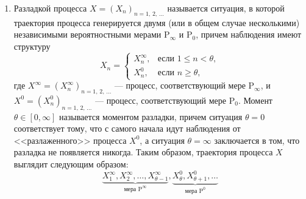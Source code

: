 \documentclass[a4paper,14pt]{extreport}
\renewcommand{\=}[1]{\stackrel{#1}{=}} %
\newcommand{\Proba}{\mathrm{P}}
\newcommand{\discretetime}{n = 1,\,2,\,\ldots}
\newcommand{\newprocessd}[1]{
    \ensuremath{
        #1 = \left(#1 _n\right)_{\discretetime}
    }
}
\newenvironment{boenumerate}
  {\begin{enumerate}\renewcommand\labelenumi{\textbf{\theenumi.}}}
  {\end{enumerate}}
\begin{document}
\begin{boenumerate}
    Построить последовательный тест~-- значит
    указать \textit{момент остановки измерений $\tau$}
    и \textit{решающее правило $\varphi(\cdot)$}.

    \item Разладкой процесса $\newprocessd{X}$
    называется ситуация, в которой траектория
    процесса генерируется двумя (или 
    в общем случае несколькими) независимыми
    вероятностными мерами $\Proba_{\infty}$
    и $\Proba_{0}$, причем наблюдения имеют структуру
    \[
    X_n = 
    \begin{cases}
        X^{\infty}_n, & \text{если } 1 \leqslant n < \theta, \\
        X^{0}_n, & \text{если } n \geqslant \theta,
    \end{cases}
    \]
    где $\newprocessd{X^{\infty}}$ --- 
    процесс, соответствующий мере $\Proba_{\infty}$,
    и $\newprocessd{X^{0}}$ ---
    процесс, соответствующий мере $\Proba_{0}$.
    Момент $\theta \in [0, \infty]$
    называется моментом разладки, причем
    ситуация $\theta = 0$ соответствует тому, что 
    с самого начала идут наблюдения от 
    <<разлаженного>> процесса $X^{0}$,
    а ситуация $\theta = \infty$ заключается в том,
    что разладка не появляется никогда.
    Таким образом, траектория процесса $X$ выглядит
    следующим образом:
    \[
    \underbrace{X^{\infty}_1, X^{\infty}_2, \ldots, 
    X^{\infty}_{\theta - 1}}
        _{\text{мера } \Proba^{\infty}},
    \underbrace{X^{0}_{\theta}, X^{0}_{\theta + 1}, \ldots}
        _{\text{мера } \Proba^{0}}
    \]


\end{boenumerate}
\end{document}
